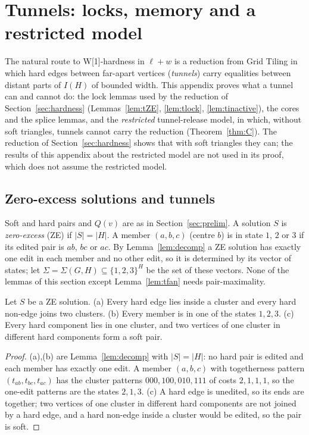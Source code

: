\section{Tunnels: locks, memory and a restricted model}\label{app:tunnels}\label{sec:tunnels}
The natural route to W[1]-hardness in $\ell+w$ is a reduction from Grid Tiling in which hard edges between far-apart vertices (\emph{tunnels}) carry equalities between distant parts of $I(H)$ of bounded width. This appendix proves what a tunnel can and cannot do: the lock lemmas used by the reduction of Section~\ref{sec:hardness} (Lemmas~\ref{lem:tZE}, \ref{lem:tlock}, \ref{lem:tinactive}), the cores and the splice lemmas, and the \emph{restricted} tunnel-release model, in which, without soft triangles, tunnels cannot carry the reduction (Theorem~\ref{thm:C}). The reduction of Section~\ref{sec:hardness} shows that with soft triangles they can; the results of this appendix about the restricted model are not used in its proof, which does not assume the restricted model.

\subsection{Zero-excess solutions and tunnels}
Soft and hard pairs and $Q(v)$ are as in Section~\ref{sec:prelim}. A solution $S$ is \emph{zero-excess} (ZE) if $|S|=|H|$. A member $(a,b,c)$ (centre $b$) is in state $1$, $2$ or $3$ if its edited pair is $ab$, $bc$ or $ac$. By Lemma~\ref{lem:decomp} a ZE solution has exactly one edit in each member and no other edit, so it is determined by its vector of states; let $\Sigma=\Sigma(G,H)\subseteq\{1,2,3\}^H$ be the set of these vectors. None of the lemmas of this section except Lemma~\ref{lem:tfan} needs pair-maximality.

\begin{lemma}\label{lem:tZE}
Let $S$ be a ZE solution. (a) Every hard edge lies inside a cluster and every hard non-edge joins two clusters. (b) Every member is in one of the states $1,2,3$. (c) Every hard component lies in one cluster, and two vertices of one cluster in different hard components form a soft pair.
\end{lemma}
\begin{proof}
(a),(b) are Lemma~\ref{lem:decomp} with $|S|=|H|$: no hard pair is edited and each member has exactly one edit. A member $(a,b,c)$ with togetherness pattern $(t_{ab},t_{bc},t_{ac})$ has the cluster patterns $000,100,010,111$ of costs $2,1,1,1$, so the one-edit patterns are the states $2,1,3$. (c) A hard edge is unedited, so its ends are together; two vertices of one cluster in different hard components are not joined by a hard edge, and a hard non-edge inside a cluster would be edited, so the pair is soft.
\end{proof}

